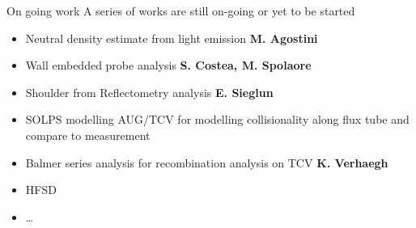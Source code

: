 \documentclass[10pt, compress]{beamer}
\newcommand\Fontvi{\fontsize{8}{7.2}\selectfont}
\begin{document}
\begin{frame}{On going work}
  A series of works are still on-going \textcolor{ta3scarletred}{or
    yet to be started}
  \begin{itemize}[<+->]
    \item Neutral density estimate from light emission
      \textbf{M. Agostini}
    \item Wall embedded probe analysis \textbf{S. Costea,
        M. Spolaore}
    \item Shoulder from Reflectometry analysis \textbf{E. Sieglun}
    \item \textcolor{ta3scarletred}{SOLPS modelling AUG/TCV for modelling collisionality
      along flux tube and compare to measurement}
    \item \textcolor{ta3scarletred}{Balmer series analysis for
        recombination analysis on TCV \textbf{K. Verhaegh}}
  \item \textcolor{ta3scarletred}{HFSD}
    \item \textcolor{ta3scarletred}{\ldots}
      
  \end{itemize}
\end{frame}
\end{document}
